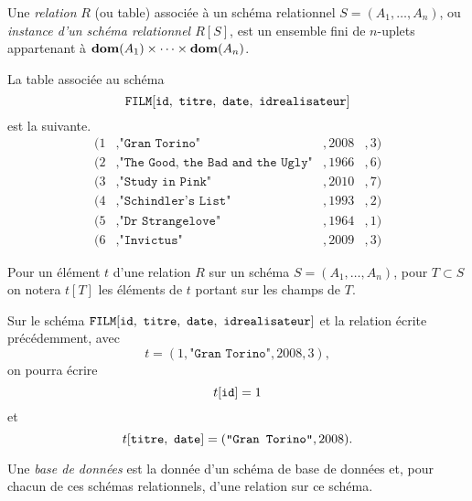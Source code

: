 
\begin{defi}[Relation]
  Une \emph{relation} $R$ (ou table) associée à un schéma relationnel $S = (A_1,\dots,A_n)$, ou \emph{instance
    d'un schéma relationnel $R[S]$}, est un ensemble fini de $n$-uplets appartenant à $\mathbf{dom}(A_1) \times \dots \times \mathbf{dom}(A_n)$.
\end{defi}

\begin{exemple}
  La table associée au schéma $$\FILM[\ttid,\ \tttitre,\ \ttdate,\ \ttidr]$$ est la suivante. 
  \begin{align*}
    (1&,\texttt{"Gran Torino"}&,2008&,3)\\
    (2&,\texttt{"The Good, the Bad and the Ugly"}&,1966&,6) \\
    (3&,\texttt{"Study in Pink"}&,2010&,7)\\
    (4&,\texttt{"Schindler's List"}&,1993&,2)\\
    (5&,\texttt{"Dr Strangelove"}&,1964&,1)\\
    (6&,\texttt{"Invictus"}&,2009&,3)
  \end{align*}
\end{exemple}

Pour un élément $t$ d'une relation $R$ sur un schéma $S = (A_1,\dots,A_n)$, pour $T  \subset S$ on notera $t[T]$ les éléments de $t$ portant sur les champs de $T$. 

\begin{exemple}
  Sur le schéma $\FILM[\ttid,\ \tttitre,\ \ttdate,\ \ttidr]$ et la relation écrite précédemment, avec 
  \begin{equation*}
    t = (1,\texttt{"Gran Torino"},2008,3), 
  \end{equation*}
  on pourra écrire 
  \begin{equation*}
    t[\mathtt{id}] = 1
  \end{equation*}
  et 
  \begin{equation*}
    t[\mathtt{titre},\ \mathtt{date}]  =(\texttt{"Gran Torino"},2008).
  \end{equation*}

\end{exemple}


\begin{defi}
  Une \emph{base de données} est la donnée d'un schéma de base de données et, pour chacun de ces schémas relationnels, d'une relation sur ce schéma. 
\end{defi}

